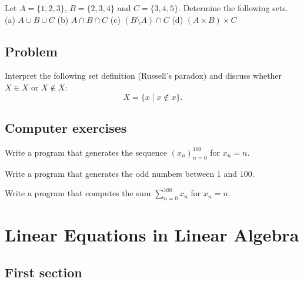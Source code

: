 \documentclass[11pt]{linearbook}
\begin{document}
\begin{exercise}
  Let $A = \{1, 2, 3\}$, $B = \{2, 3, 4\}$ and $C = \{3, 4, 5\}$.
  Determine the following sets. \\
  (a) $A \cup B \cup C$ \quad
  (b) $A \cap B \cap C$ \quad
  (c) $(B \setminus A) \cap C$ \quad
  (d) $(A \times B) \times C$
\end{exercise}

\section*{Problem}

\begin{problem}
  Interpret the following set definition (Russell's paradox) and discuss
  whether $X \in X$ or $X \notin X$:
  \begin{equation}
    X = \{x \mid x \notin x\}.
  \end{equation}
\end{problem}

\section*{Computer exercises}

\begin{programming}
  Write a program that generates the sequence $(x_n)_{n=0}^{100}$
  for $x_n = n$.
\end{programming}

\begin{programming}
  Write a program that generates the odd numbers between $1$ and $100$.
\end{programming}

\begin{programming}
  Write a program that computes the sum $\sum_{n=0}^{100} x_n$
  for $x_n = n$.
\end{programming}

\chapter{Linear Equations in Linear Algebra}

\begin{summary}
  \blindtext
\end{summary}

\section{First section}
\Blindtext
\end{document}
